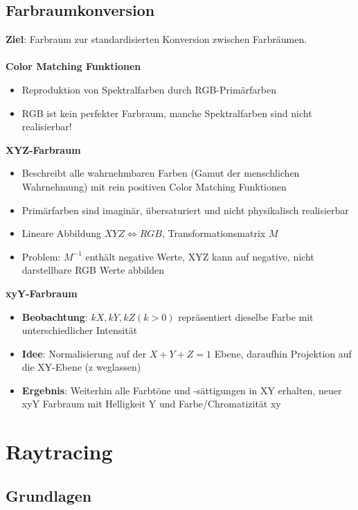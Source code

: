 \documentclass[10pt,a4paper]{article}
\begin{document}
	\newpage
	\subsection{Farbraumkonversion}
	\label{bfp:sub:farbraumkonversion}

	\textbf{Ziel}: Farbraum zur standardisierten Konversion zwischen Farbräumen.\\\\
	\textbf{Color Matching Funktionen}
		\begin{itemize}
			\item Reproduktion von Spektralfarben durch RGB-Primärfarben
			\item RGB ist kein perfekter Farbraum, manche Spektralfarben sind nicht realisierbar!
		\end{itemize}		
	\textbf{XYZ-Farbraum}
		\begin{itemize}
			\item Beschreibt alle wahrnehmbaren Farben (\glqq Gamut der menschlichen Wahrnehmung\grqq) mit rein positiven Color Matching Funktionen
			\item Primärfarben sind imaginär, übersaturiert und nicht physikalisch realisierbar
			\item Lineare Abbildung $XYZ \Leftrightarrow RGB$, Transformationsmatrix $M$
			\item Problem: $M^{-1}$ enthält negative Werte, XYZ kann auf negative, nicht darstellbare RGB Werte abbilden
		\end{itemize}
	\textbf{xyY-Farbraum}
		\begin{itemize}
			\item \textbf{Beobachtung}: $kX, kY, kZ (k > 0)$ repräsentiert dieselbe Farbe mit unterschiedlicher Intensität
			\item \textbf{Idee}: Normalisierung auf der $X + Y + Z = 1$ Ebene, daraufhin Projektion auf die XY-Ebene (z weglassen)
			\item \textbf{Ergebnis}: Weiterhin alle Farbtöne und -sättigungen in XY erhalten, neuer xyY Farbraum mit Helligkeit Y und Farbe/Chromatizität xy
		\end{itemize}

	\newpage
	\section{Raytracing}
	\label{rt:sec:raytracing}

	\subsection{Grundlagen}
	\label{rt:sub:grundlagen}
\end{document}
